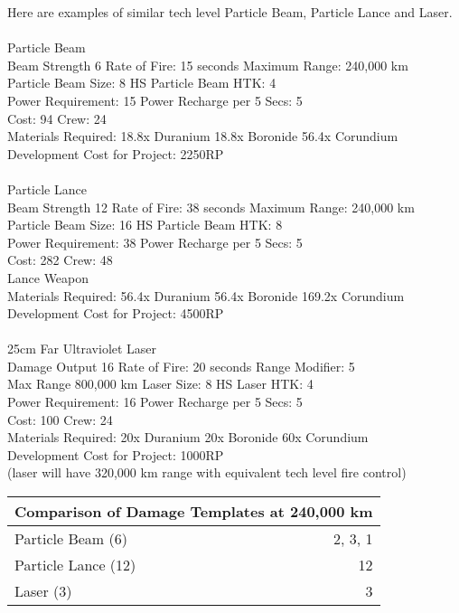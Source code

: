 \documentclass[../../Aurora C# unofficial manual.tex]{subfiles}
\begin{document}
	Here are examples of similar tech level Particle Beam, Particle Lance and Laser.\\\\
	Particle Beam\\
	Beam Strength 6 \space\space\space Rate of Fire: 15 seconds \space Maximum Range: 240,000 km\\
	Particle Beam Size: 8 HS \space\space\space Particle Beam HTK: 4\\
	Power Requirement: 15 \space\space\space Power Recharge per 5 Secs: 5\\
	Cost: 94 \space\space\space Crew: 24\\
	Materials Required: 18.8x Duranium  18.8x Boronide  56.4x Corundium\\
	Development Cost for Project: 2250RP\\\\
	Particle Lance\\
	Beam Strength 12 \space\space\space Rate of Fire: 38 seconds \space\space\space Maximum Range: 240,000 km\\
	Particle Beam Size: 16 HS \space\space\space Particle Beam HTK: 8\\
	Power Requirement: 38 \space\space\space Power Recharge per 5 Secs: 5\\
	Cost: 282 \space\space\space Crew: 48\\
	Lance Weapon\\
	Materials Required: 56.4x Duranium  56.4x Boronide  169.2x Corundium\\
	Development Cost for Project: 4500RP\\\\
	25cm Far Ultraviolet Laser\\
	Damage Output 16 \space\space\space Rate of Fire: 20 seconds \space\space\space Range Modifier: 5\\
	Max Range 800,000 km \space\space\space Laser Size: 8 HS    Laser HTK: 4\\
	Power Requirement: 16 \space\space\space Power Recharge per 5 Secs: 5\\
	Cost: 100 \space\space\space Crew: 24\\
	Materials Required: 20x Duranium  20x Boronide  60x Corundium\\
	Development Cost for Project: 1000RP\\
	(laser will have 320,000 km range with equivalent tech level fire control)
	
	\begin{center}
		\begin{tabular}{|l|r|}
			\hline
			\multicolumn{2}{|c|}{\textbf{Comparison of Damage Templates at 240,000 km}} \\
			\hline
			Particle Beam (6) & 2, 3, 1 \\
			\hline
			Particle Lance (12) & 12 \\
			\hline
			Laser (3) & 3 \\
			\hline
		\end{tabular}
	\end{center}
	
\end{document}

